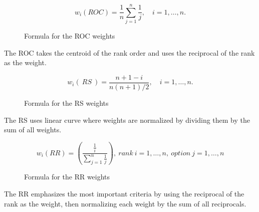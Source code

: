 \begin{figure}[h]
    \centering
    \[ w_{i}(ROC) = \frac{1}{n} \sum_{j=1}^{n} \frac{1}{j}, \quad i = 1, \ldots, n. \]
    \caption{Formula for the \ac{ROC} weights}
\end{figure}

The \ac{ROC} takes the centroid of the rank order and uses the reciprocal of the rank as the weight.

\begin{figure}[h]
    \centering
    \[ w_{i}(\ RS\ ) = \frac{n + 1 - i}{n(n + 1)/2}, \quad i = 1, \ldots, n. \]
    \caption{Formula for the \ac{RS} weights}
\end{figure}

The \ac{RS} uses linear curve where weights are normalized by dividing them by the sum of all weights.

\begin{figure}[h]
    \centering
    \[ w_i(RR) = \left( \frac{\frac{1}{i}}{\sum_{j=1}^{n} \frac{1}{j}} \right) , \ rank\ i = 1, \ldots, n, \ option\ j = 1, \ldots, n \]
    \caption{Formula for the \ac{RR} weights}
\end{figure}

The \ac{RR} emphasizes the most important criteria by using the reciprocal of the rank as the weight, then normalizing each weight by the sum of all reciprocals.